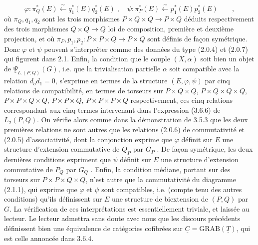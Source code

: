 \begin{equation*}
\varphi : \pi_Q^*(E) \overset{\sim}{\longleftarrow} q_1^*(E)q_2^*(E) \;,\quad \psi : \pi_P^*(E) \overset{\sim}{\longleftarrow} p_1^*(E)p_2^*(E) \qquad ,
\end{equation*}
où $\pi_Q,q_1,q_2$ sont les trois morphismes $P\times Q\times Q \longrightarrow P\times Q$ déduits respectivement des trois morphismes $Q\times Q \longrightarrow Q$ loi de composition, première et deuxième projection, et où $\pi_P,p_1,p_2: P\times P\times Q \longrightarrow P\times Q$ sont définis de façon symétrique. Donc $\varphi$ et $\psi$ peuvent s'interpréter comme des données du type (2.0.4) et (2.0.7) qui figurent dans 2.1. Enfin, la condition que le couple $(X,\alpha)$ soit bien un objet de $\underline{\Psi}_{L.(P,Q)}(G)$, i.e. que la trivialisation partielle $\alpha$ soit compatible avec la relation $d_od_1=0$, s'exprime en termes de la structure $(E,\varphi,\psi)$ par cinq relations de compatibilité, en termes de torseurs sur $P\times Q\times Q$, $P\times Q\times Q\times Q$, $P\times P\times Q\times Q$, $P\times P\times Q$, $P\times P\times P\times Q$ respectivement, ces cinq relations correspondant aux cinq termes intervenant dans l'expression (3.6.6) de $L_2(P,Q)$. On vérifie alors comme dans la démonstration de 3.5.3 que les deux premières relations ne sont autres que les relations (2.0.6) de commutativité et (2.0.5) d'associativité, dont la conjonction exprime que $\varphi$ définit sur $E$ une structure d'extension commutative de $Q_P$ par $G_P$ . De façon symétrique, les deux dernières conditions expriment que $\psi$ définit sur $E$ une structure d'extension commutative de $P_Q$ par $G_Q$ . Enfin, la condition médiane, portant sur des torseurs sur $P\times P\times Q\times Q$, n'est autre que la commutativité du diagramme (2.1.1), qui exprime que $\varphi$ et $\psi$ sont compatibles, i.e. (compte tenu des autres conditions) qu'ils définissent sur $E$ une structure de biextension de $(P,Q)$ par $G$. La vérification de ces
interprétations est essentiellement triviale, et laissée au lecteur. Le lecteur admettra sans doute avec nous que les discours précédents définissent bien une équivalence de catégories cofibrées sur $\underline{C} = \mathrm{GRAB}(\underline{T})$, qui est celle annoncée dans 3.6.4.

